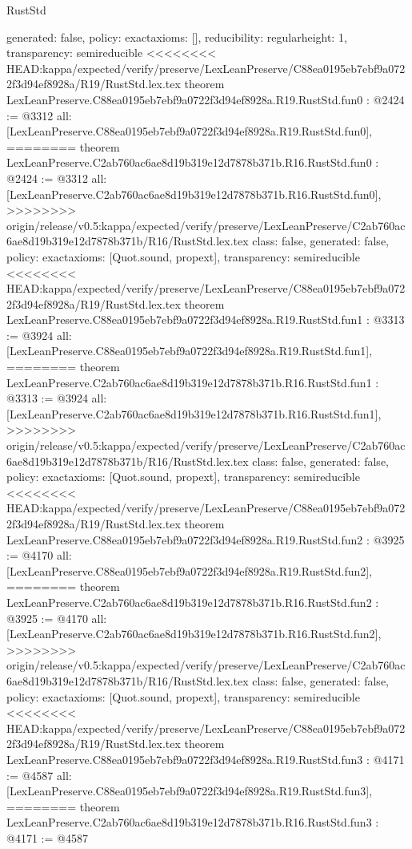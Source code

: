 \begin{lexlean}{RustStd}
\begin{coremodule}
{\begin{coremodule}
{{{  generated: false,
  policy: exact{axioms: []},
  reducibility: regular{height: 1},
  transparency: semireducible
}
<<<<<<<< HEAD:kappa/expected/verify/preserve/LexLeanPreserve/C88ea0195eb7ebf9a0722f3d94ef8928a/R19/RustStd.lex.tex
theorem LexLeanPreserve.C88ea0195eb7ebf9a0722f3d94ef8928a.R19.RustStd.fun0 : @2424 := @3312 {
  all: [LexLeanPreserve.C88ea0195eb7ebf9a0722f3d94ef8928a.R19.RustStd.fun0],
========
theorem LexLeanPreserve.C2ab760ac6ae8d19b319e12d7878b371b.R16.RustStd.fun0 : @2424 := @3312 {
  all: [LexLeanPreserve.C2ab760ac6ae8d19b319e12d7878b371b.R16.RustStd.fun0],
>>>>>>>> origin/release/v0.5:kappa/expected/verify/preserve/LexLeanPreserve/C2ab760ac6ae8d19b319e12d7878b371b/R16/RustStd.lex.tex
  class: false,
  generated: false,
  policy: exact{axioms: [Quot.sound, propext]},
  transparency: semireducible
}
<<<<<<<< HEAD:kappa/expected/verify/preserve/LexLeanPreserve/C88ea0195eb7ebf9a0722f3d94ef8928a/R19/RustStd.lex.tex
theorem LexLeanPreserve.C88ea0195eb7ebf9a0722f3d94ef8928a.R19.RustStd.fun1 : @3313 := @3924 {
  all: [LexLeanPreserve.C88ea0195eb7ebf9a0722f3d94ef8928a.R19.RustStd.fun1],
========
theorem LexLeanPreserve.C2ab760ac6ae8d19b319e12d7878b371b.R16.RustStd.fun1 : @3313 := @3924 {
  all: [LexLeanPreserve.C2ab760ac6ae8d19b319e12d7878b371b.R16.RustStd.fun1],
>>>>>>>> origin/release/v0.5:kappa/expected/verify/preserve/LexLeanPreserve/C2ab760ac6ae8d19b319e12d7878b371b/R16/RustStd.lex.tex
  class: false,
  generated: false,
  policy: exact{axioms: [Quot.sound, propext]},
  transparency: semireducible
}
<<<<<<<< HEAD:kappa/expected/verify/preserve/LexLeanPreserve/C88ea0195eb7ebf9a0722f3d94ef8928a/R19/RustStd.lex.tex
theorem LexLeanPreserve.C88ea0195eb7ebf9a0722f3d94ef8928a.R19.RustStd.fun2 : @3925 := @4170 {
  all: [LexLeanPreserve.C88ea0195eb7ebf9a0722f3d94ef8928a.R19.RustStd.fun2],
========
theorem LexLeanPreserve.C2ab760ac6ae8d19b319e12d7878b371b.R16.RustStd.fun2 : @3925 := @4170 {
  all: [LexLeanPreserve.C2ab760ac6ae8d19b319e12d7878b371b.R16.RustStd.fun2],
>>>>>>>> origin/release/v0.5:kappa/expected/verify/preserve/LexLeanPreserve/C2ab760ac6ae8d19b319e12d7878b371b/R16/RustStd.lex.tex
  class: false,
  generated: false,
  policy: exact{axioms: [Quot.sound, propext]},
  transparency: semireducible
}
<<<<<<<< HEAD:kappa/expected/verify/preserve/LexLeanPreserve/C88ea0195eb7ebf9a0722f3d94ef8928a/R19/RustStd.lex.tex
theorem LexLeanPreserve.C88ea0195eb7ebf9a0722f3d94ef8928a.R19.RustStd.fun3 : @4171 := @4587 {
  all: [LexLeanPreserve.C88ea0195eb7ebf9a0722f3d94ef8928a.R19.RustStd.fun3],
========
theorem LexLeanPreserve.C2ab760ac6ae8d19b319e12d7878b371b.R16.RustStd.fun3 : @4171 := @4587 {
}}}}}}}
\end{coremodule}}
\end{coremodule}
\end{lexlean}
